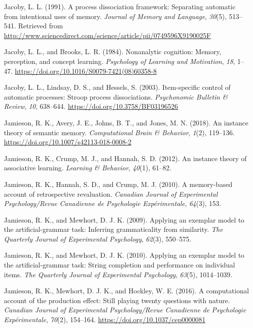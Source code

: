 \documentclass[]{DissertateCUNY}
\begin{document}
\leavevmode\hypertarget{ref-jacoby_process_1991}{}%
Jacoby, L. L. (1991). A process dissociation framework: Separating
automatic from intentional uses of memory. \emph{Journal of Memory and
Language}, \emph{30}(5), 513--541. Retrieved from
\url{http://www.sciencedirect.com/science/article/pii/0749596X9190025F}

\leavevmode\hypertarget{ref-jacoby_nonanalytic_1984}{}%
Jacoby, L. L., and Brooks, L. R. (1984). Nonanalytic cognition: Memory,
perception, and concept learning. \emph{Psychology of Learning and
Motivation}, \emph{18}, 1--47.
\url{https://doi.org/10.1016/S0079-7421(08)60358-8}

\leavevmode\hypertarget{ref-jacoby_item-specific_2003}{}%
Jacoby, L. L., Lindsay, D. S., and Hessels, S. (2003). Item-specific
control of automatic processes: Stroop process dissociations.
\emph{Psychonomic Bulletin \& Review}, \emph{10}, 638--644.
\url{https://doi.org/10.3758/BF03196526}

\leavevmode\hypertarget{ref-jamieson_instance_2018}{}%
Jamieson, R. K., Avery, J. E., Johns, B. T., and Jones, M. N. (2018). An
instance theory of semantic memory. \emph{Computational Brain \&
Behavior}, \emph{1}(2), 119--136.
\url{https://doi.org/10.1007/s42113-018-0008-2}

\leavevmode\hypertarget{ref-jamieson_instance_2012}{}%
Jamieson, R. K., Crump, M. J., and Hannah, S. D. (2012). An instance
theory of associative learning. \emph{Learning \& Behavior},
\emph{40}(1), 61--82.

\leavevmode\hypertarget{ref-jamieson_memory-based_2010}{}%
Jamieson, R. K., Hannah, S. D., and Crump, M. J. (2010). A memory-based
account of retrospective revaluation. \emph{Canadian Journal of
Experimental Psychology/Revue Canadienne de Psychologie Expérimentale},
\emph{64}(3), 153.

\leavevmode\hypertarget{ref-jamieson_applying_2009}{}%
Jamieson, R. K., and Mewhort, D. J. K. (2009). Applying an exemplar
model to the artificial-grammar task: Inferring grammaticality from
similarity. \emph{The Quarterly Journal of Experimental Psychology},
\emph{62}(3), 550--575.

\leavevmode\hypertarget{ref-jamieson_applying_2010}{}%
Jamieson, R. K., and Mewhort, D. J. K. (2010). Applying an exemplar
model to the artificial-grammar task: String completion and performance
on individual items. \emph{The Quarterly Journal of Experimental
Psychology}, \emph{63}(5), 1014--1039.

\leavevmode\hypertarget{ref-jamieson_computational_2016}{}%
Jamieson, R. K., Mewhort, D. J. K., and Hockley, W. E. (2016). A
computational account of the production effect: Still playing twenty
questions with nature. \emph{Canadian Journal of Experimental
Psychology/Revue Canadienne de Psychologie Expérimentale}, \emph{70}(2),
154--164. \url{https://doi.org/10.1037/cep0000081}
\end{document}
